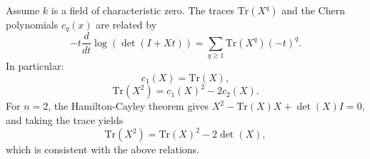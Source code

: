 Assume $k$ is a field of characteristic zero. The traces $\text{Tr}(X^q)$ and the Chern polynomials $c_q(x)$ are related by
$$
-t \frac{d}{dt} \log(\det(I + Xt)) = \sum_{q \geq 1} \text{Tr}(X^q)(-t)^q.
$$
In particular:
$$
c_1(X) = \text{Tr}(X),
$$
$$
\text{Tr}(X^2) = c_1(X)^2 - 2c_2(X).
$$
For $n = 2$, the Hamilton-Cayley theorem gives $X^2 - \text{Tr}(X)X + \det(X)I = 0$, and taking the trace yields
$$
\text{Tr}(X^2) = \text{Tr}(X)^2 - 2\det(X),
$$
which is consistent with the above relations.
